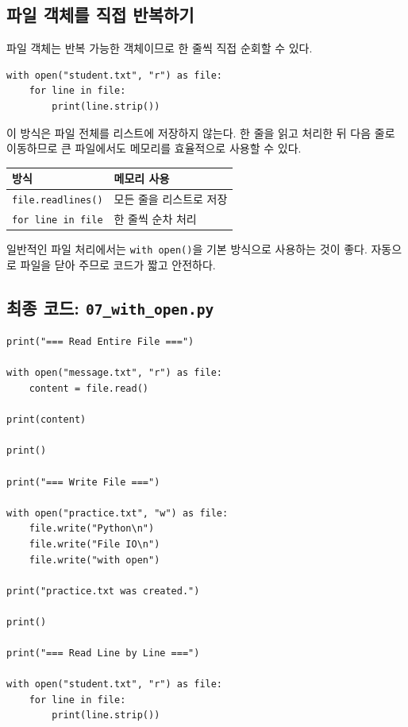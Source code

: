 \documentclass[11pt,a4paper]{article}
\begin{document}
\subsection{파일 객체를 직접 반복하기}

파일 객체는 반복 가능한 객체이므로 한 줄씩 직접 순회할 수 있다.

\begin{lstlisting}
with open("student.txt", "r") as file:
    for line in file:
        print(line.strip())
\end{lstlisting}

이 방식은 파일 전체를 리스트에 저장하지 않는다. 한 줄을 읽고 처리한 뒤 다음 줄로 이동하므로 큰 파일에서도 메모리를 효율적으로 사용할 수 있다.

\begin{center}
\begin{tabular}{ll}
\toprule
방식 & 메모리 사용 \\
\midrule
\texttt{file.readlines()} & 모든 줄을 리스트로 저장 \\
\texttt{for line in file} & 한 줄씩 순차 처리 \\
\bottomrule
\end{tabular}
\end{center}

\begin{importantbox}
일반적인 파일 처리에서는 \texttt{with open()}을 기본 방식으로 사용하는 것이 좋다. 자동으로 파일을 닫아 주므로 코드가 짧고 안전하다.
\end{importantbox}

\subsection{최종 코드: \texttt{07\_with\_open.py}}

\begin{lstlisting}
print("=== Read Entire File ===")

with open("message.txt", "r") as file:
    content = file.read()

print(content)

print()

print("=== Write File ===")

with open("practice.txt", "w") as file:
    file.write("Python\n")
    file.write("File IO\n")
    file.write("with open")

print("practice.txt was created.")

print()

print("=== Read Line by Line ===")

with open("student.txt", "r") as file:
    for line in file:
        print(line.strip())
\end{lstlisting}
\end{document}
